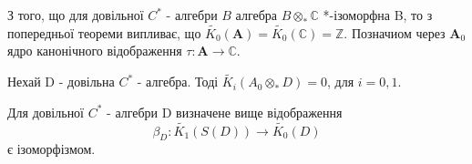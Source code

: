 З того, що для довільної $C^*$ - алгебри $B$ алгебра $B \otimes_* \mathbb{C}$
*-ізоморфна B, то з попередньої теореми випливає, що $\widetilde{K_0}(\mathbf{A}) =
\widetilde{K_0}(\mathbb{C}) = \mathbb{Z}$.
Позначиом через $ \mathbf{A}_0 $ ядро канонічного відображення $\tau: \mathbf{A} \to \mathbb{C}$.
\begin{corollary}
    Нехай D - довільна $C^*$ - алгебра.
    Тоді $\widetilde{K_i}(A_0 \otimes_* D) = 0$, для $i = 0,1$.
\end{corollary}

\begin{theorem}
Для довільної $C^*$ - алгебри D визначене вище відображення
    \begin{equation*}
        \beta_D: \widetilde{K_1}(S(D)) \to \widetilde{K_0}(D)
    \end{equation*}
    є ізоморфізмом.
\end{theorem}

